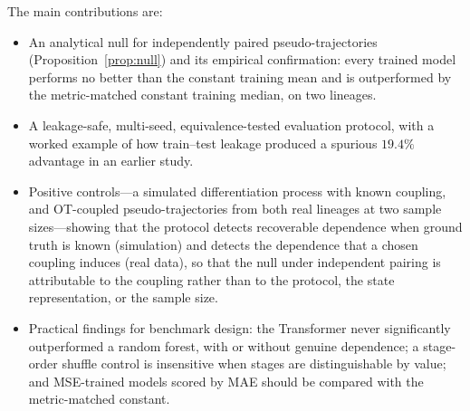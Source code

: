 \documentclass[pdflatex,sn-mathphys-num]{sn-jnl}
\theoremstyle{thmstyleone}%
\theoremstyle{thmstyletwo}%
\theoremstyle{thmstylethree}%
\begin{document}
The main contributions are:
\begin{itemize}
    \item An analytical null for independently paired pseudo-trajectories (Proposition~\ref{prop:null}) and its empirical confirmation: every trained model performs no better than the constant training mean and is outperformed by the metric-matched constant training median, on two lineages.
    \item A leakage-safe, multi-seed, equivalence-tested evaluation protocol, with a worked example of how train--test leakage produced a spurious $19.4\%$ advantage in an earlier study.
    \item Positive controls---a simulated differentiation process with known coupling, and OT-coupled pseudo-trajectories from both real lineages at two sample sizes---showing that the protocol detects recoverable dependence when ground truth is known (simulation) and detects the dependence that a chosen coupling induces (real data), so that the null under independent pairing is attributable to the coupling rather than to the protocol, the state representation, or the sample size.
    \item Practical findings for benchmark design: the Transformer never significantly outperformed a random forest, with or without genuine dependence; a stage-order shuffle control is insensitive when stages are distinguishable by value; and MSE-trained models scored by MAE should be compared with the metric-matched constant.
\end{itemize}
\end{document}
